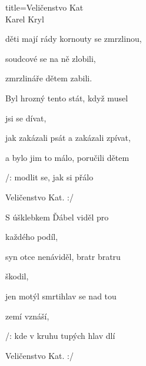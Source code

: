 \begin{song}{title=\predtitle\centering Veličenstvo Kat \\\large Karel Kryl  \vspace*{-0.3cm}}
\begin{centerjustified}
\begin{varwidth}[t]{0.55\textwidth}
 	děti mají rády kornouty se zmrzlinou,
  
  	soudcové se na ně zlobili,
   
   	zmrzlináře dětem zabili.


\end{varwidth}\mezisloupci\begin{varwidth}[t]{0.55\textwidth}\setlength{\parindent}{\pindent}\vspace*{0.55cm}  %

\sloka
	Byl hrozný tento stát, když musel 

	jsi se dívat,
   
   	jak zakázali psát a zakázali zpívat,
   
   	a bylo jim to málo, poručili dětem
   
   	/: modlit se, jak si přálo 

	Veličenstvo Kat. :/

\sloka
	S úšklebkem Ďábel viděl pro 

	každého podíl,
  
  	syn otce nenáviděl, bratr bratru 

	škodil,
   
   	jen motýl smrtihlav se nad tou 

	zemí vznáší,
   
   	/: kde v kruhu tupých hlav dlí 

	Veličenstvo Kat. :/


\end{varwidth}

\end{centerjustified}
\setcounter{Slokočet}{0}
\end{song}

